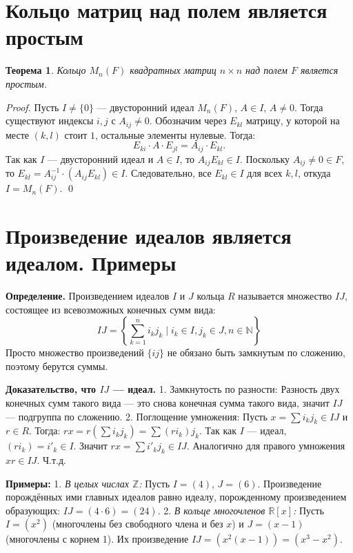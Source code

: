 \documentclass[12pt, a4paper]{article}
\newtheorem{theorem}{Теорема}
\theoremstyle{definition}
\theoremstyle{remark}
\begin{document}
\section{Кольцо матриц над полем является простым}

\begin{theorem}
	Кольцо $M_n(F)$ квадратных матриц $n \times n$ над полем $F$ является простым.
\end{theorem}
\begin{proof}
	Пусть $I \neq \{0\}$ --- двусторонний идеал $M_n(F)$, $A \in I$, $A \neq 0$. Тогда существуют индексы $i, j$ с $A_{ij} \neq 0$. Обозначим через $E_{kl}$ матрицу, у которой на месте $(k,l)$ стоит $1$, остальные элементы нулевые. Тогда:
	\[
	E_{ki} \cdot A \cdot E_{jl} = A_{ij} \cdot E_{kl}.
	\]
	Так как $I$ --- двусторонний идеал и $A \in I$, то $A_{ij} E_{kl} \in I$. Поскольку $A_{ij} \neq 0 \in F$, то $E_{kl} = A_{ij}^{-1} \cdot (A_{ij} E_{kl}) \in I$. Следовательно, все $E_{kl} \in I$ для всех $k, l$, откуда $I = M_n(F)$. \qed
\end{proof}

\section{Произведение идеалов является идеалом. Примеры}


\textbf{Определение.} Произведением идеалов $I$ и $J$ кольца $R$ называется множество $IJ$, состоящее из всевозможных конечных сумм вида:
$$ IJ = \left\{ \sum_{k=1}^n i_k j_k \mid i_k \in I, j_k \in J, n \in \mathbb{N} \right\} $$
Просто множество произведений $\{ij\}$ не обязано быть замкнутым по сложению, поэтому берутся суммы.

\textbf{Доказательство, что $IJ$ — идеал.}
1. Замкнутость по разности: Разность двух конечных сумм такого вида — это снова конечная сумма такого вида, значит $IJ$ — подгруппа по сложению.
2. Поглощение умножения: Пусть $x = \sum i_k j_k \in IJ$ и $r \in R$. Тогда:
$rx = r \left( \sum i_k j_k \right) = \sum (r i_k) j_k$.
Так как $I$ — идеал, $(r i_k) = i'_k \in I$. Значит $rx = \sum i'_k j_k \in IJ$. Аналогично для правого умножения $xr \in IJ$. Ч.т.д.

\textbf{Примеры:}
1. \textit{В целых числах $\mathbb{Z}$:} Пусть $I = (4)$, $J = (6)$. Произведение порождённых ими главных идеалов равно идеалу, порожденному произведением образующих: $IJ = (4 \cdot 6) = (24)$.
2. \textit{В кольце многочленов $\mathbb{R}[x]$:} Пусть $I = (x^2)$ (многочлены без свободного члена и без $x$) и $J = (x-1)$ (многочлены с корнем 1). Их произведение $IJ = (x^2(x-1)) = (x^3 - x^2)$.
\end{document}
